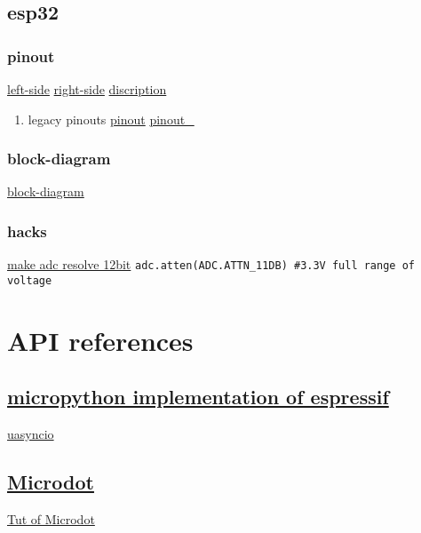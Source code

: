 \documentclass[11pt]{article}
\begin{document}
\subsection{esp32}
\label{sec:orgf959c51}
\subsubsection{pinout}
\label{sec:orgb37466e}
\href{./assets/pinout-0.png}{left-side}
\href{./assets/pinout-1.png}{right-side}
\href{./assets/pinout-disc.png}{discription}
\begin{enumerate}
\item legacy pinouts
\label{sec:orge543765}
\href{./assets/esp32-pinout.png}{pinout}
\href{./assets/esp32-pinout1.png}{pinout\_}
\end{enumerate}
\subsubsection{block-diagram}
\label{sec:orgd91cbb9}
\href{./assets/esp32-block-diagram.png}{block-diagram}
\subsubsection{hacks}
\label{sec:org0af544a}
\href{https://microcontrollerslab.com/esp32-esp8266-adc-micropython-measure-analog-readings/}{make adc resolve 12bit}
\texttt{adc.atten(ADC.ATTN\_11DB)       \#3.3V full range of voltage}
\section{API references}
\label{sec:orge563328}
\subsection{\href{https://docs.micropython.org/en/latest/esp32/quickref.html}{micropython implementation of espressif}}
\label{sec:org0ced470}
\href{https://docs.micropython.org/en/latest/library/uasyncio.html}{uasyncio}
\subsection{\href{https://microdot.readthedocs.io/en/latest/api.html}{Microdot}}
\label{sec:org9c513af}
\href{https://bhave.sh/micropython-microdot/}{Tut of Microdot}
\end{document}
